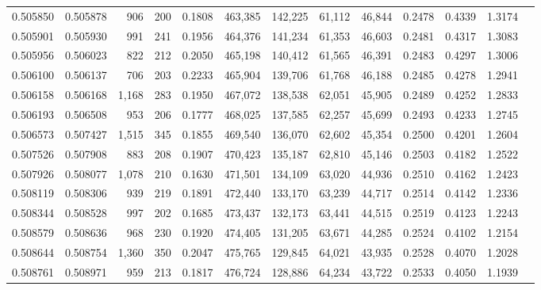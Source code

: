 \begin{tabular}{rrrrrrrrrrrrr}
0.505850 & 0.505878 &    906 &   200 &                                     0.1808 & 463,385 & 142,225 &  61,112 &  46,844 & 0.2478 & 0.4339 & 1.3174 \\
0.505901 & 0.505930 &    991 &   241 &                                     0.1956 & 464,376 & 141,234 &  61,353 &  46,603 & 0.2481 & 0.4317 & 1.3083 \\
0.505956 & 0.506023 &    822 &   212 &                                     0.2050 & 465,198 & 140,412 &  61,565 &  46,391 & 0.2483 & 0.4297 & 1.3006 \\
0.506100 & 0.506137 &    706 &   203 &                                     0.2233 & 465,904 & 139,706 &  61,768 &  46,188 & 0.2485 & 0.4278 & 1.2941 \\
0.506158 & 0.506168 &  1,168 &   283 &                                     0.1950 & 467,072 & 138,538 &  62,051 &  45,905 & 0.2489 & 0.4252 & 1.2833 \\
0.506193 & 0.506508 &    953 &   206 &                                     0.1777 & 468,025 & 137,585 &  62,257 &  45,699 & 0.2493 & 0.4233 & 1.2745 \\
0.506573 & 0.507427 &  1,515 &   345 &                                     0.1855 & 469,540 & 136,070 &  62,602 &  45,354 & 0.2500 & 0.4201 & 1.2604 \\
0.507526 & 0.507908 &    883 &   208 &                                     0.1907 & 470,423 & 135,187 &  62,810 &  45,146 & 0.2503 & 0.4182 & 1.2522 \\
0.507926 & 0.508077 &  1,078 &   210 &                                     0.1630 & 471,501 & 134,109 &  63,020 &  44,936 & 0.2510 & 0.4162 & 1.2423 \\
0.508119 & 0.508306 &    939 &   219 &                                     0.1891 & 472,440 & 133,170 &  63,239 &  44,717 & 0.2514 & 0.4142 & 1.2336 \\
0.508344 & 0.508528 &    997 &   202 &                                     0.1685 & 473,437 & 132,173 &  63,441 &  44,515 & 0.2519 & 0.4123 & 1.2243 \\
0.508579 & 0.508636 &    968 &   230 &                                     0.1920 & 474,405 & 131,205 &  63,671 &  44,285 & 0.2524 & 0.4102 & 1.2154 \\
0.508644 & 0.508754 &  1,360 &   350 &                                     0.2047 & 475,765 & 129,845 &  64,021 &  43,935 & 0.2528 & 0.4070 & 1.2028 \\
0.508761 & 0.508971 &    959 &   213 &                                     0.1817 & 476,724 & 128,886 &  64,234 &  43,722 & 0.2533 & 0.4050 & 1.1939 \\

\end{tabular}
